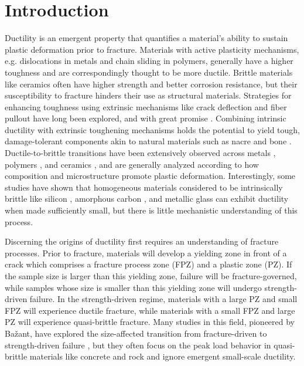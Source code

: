 \documentclass[11pt]{article}
\begin{document}
    \section{Introduction}
        Ductility is an emergent property that quantifies a material's ability to sustain plastic deformation prior to fracture.
        Materials with active plasticity mechanisms, e.g. dislocations in metals and chain sliding in polymers, generally have a higher toughness and are correspondingly thought to be more ductile.
        Brittle materials like ceramics often have higher strength and better corrosion resistance, but their susceptibility to fracture hinders their use as structural materials.
        Strategies for enhancing toughness using extrinsic mechanisms like crack deflection and fiber pullout have long been explored, and with great promise \cite{evans1990perspective, ritchie2011conflicts, mirkhalaf2014overcoming, bouville2014strong}. 
        Combining intrinsic ductility with extrinsic toughening mechanisms holds the potential to yield tough, damage-tolerant components akin to natural materials such as nacre and bone \cite{launey2010mechanistic, launey2010mechanistic-bone, dastjerdi2013weak}.
        Ductile-to-brittle transitions have been extensively observed across metals \cite{li2005ductile, mullner1997ductile}, polymers \cite{brown1982model, quagliato2022quasi}, and ceramics \cite{karch1987ceramics, lawn1994making}, and are generally analyzed according to how composition and microstructure promote plastic deformation.
        Interestingly, some studies have shown that homogeneous materials considered to be intrinsically brittle like silicon \cite{hirsch1989brittle, ostlund2009brittle, issa2021situ}, amorphous carbon \cite{albiez2019size}, and metallic glass \cite{chen2015ductility} can exhibit ductility when made sufficiently small, but there is little mechanistic understanding of this process. 
        
        Discerning the origins of ductility first requires an understanding of fracture processes.
        Prior to fracture, materials will develop a yielding zone in front of a crack which comprises a fracture process zone (FPZ) and a plastic zone (PZ).
        If the sample size is larger than this yielding zone, failure will be fracture-governed, while samples whose size is smaller than this yielding zone will undergo strength-driven failure.
        In the strength-driven regime, materials with a large PZ and small FPZ will experience ductile fracture, while materials with a small FPZ and large PZ will experience quasi-brittle fracture.
        Many studies in this field, pioneered by Ba{\v{z}}ant, have explored the size-affected transition from fracture-driven to strength-driven failure \cite{bavzant1984size, bavzant1990size, bavzant1999size, bavzant2021quasibrittle}, but they often focus on the peak load behavior in quasi-brittle materials like concrete and rock and ignore emergent small-scale ductility.
        
\end{document}

